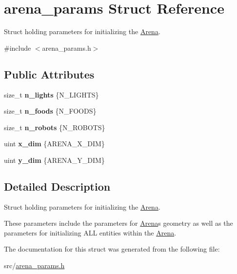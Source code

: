 \hypertarget{structarena__params}{}\section{arena\+\_\+params Struct Reference}
\label{structarena__params}


Struct holding parameters for initializing the \mbox{\hyperlink{class_arena}{Arena}}.  




{\ttfamily \#include $<$arena\+\_\+params.\+h$>$}

\subsection*{Public Attributes}
\begin{DoxyCompactItemize}
\item 
\mbox{\label{structarena__params_a98012558dd0075a9f0df9f38140c5bbd}} 
size\+\_\+t {\bfseries n\+\_\+lights} \{N\+\_\+\+L\+I\+G\+H\+TS\}
\item 
\mbox{\label{structarena__params_a4160066249e38b463e638d0f8478a5c1}} 
size\+\_\+t {\bfseries n\+\_\+foods} \{N\+\_\+\+F\+O\+O\+DS\}
\item 
\mbox{\label{structarena__params_a6ae235113b4a6870d502c913c65ad9a2}} 
size\+\_\+t {\bfseries n\+\_\+robots} \{N\+\_\+\+R\+O\+B\+O\+TS\}
\item 
\mbox{\label{structarena__params_afa86b434ed8ea5a4fe9ae14ae1438e8f}} 
uint {\bfseries x\+\_\+dim} \{A\+R\+E\+N\+A\+\_\+\+X\+\_\+\+D\+IM\}
\item 
\mbox{\label{structarena__params_ab5d50b9affa9c753c15e1d6f088824af}} 
uint {\bfseries y\+\_\+dim} \{A\+R\+E\+N\+A\+\_\+\+Y\+\_\+\+D\+IM\}
\end{DoxyCompactItemize}


\subsection{Detailed Description}
Struct holding parameters for initializing the \mbox{\hyperlink{class_arena}{Arena}}. 

These parameters include the parameters for \mbox{\hyperlink{class_arena}{Arena}}\textquotesingle{}s geometry as well as the parameters for initializing A\+LL entities within the \mbox{\hyperlink{class_arena}{Arena}}. 

The documentation for this struct was generated from the following file\+:\begin{DoxyCompactItemize}
\item 
src/\mbox{\hyperlink{arena__params_8h}{arena\+\_\+params.\+h}}\end{DoxyCompactItemize}
